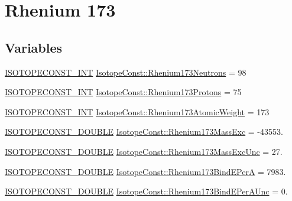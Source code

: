 \hypertarget{group___isotope_const-_rhenium-_re173}{}\section{Rhenium 173}
\label{group___isotope_const-_rhenium-_re173}
\subsection*{Variables}
\begin{DoxyCompactItemize}
\item 
\mbox{\hyperlink{group___isotope_const-_macros_ga5f18360b3e99483a35c32d789e62621c}{I\+S\+O\+T\+O\+P\+E\+C\+O\+N\+S\+T\+\_\+\+I\+NT}} \mbox{\hyperlink{group___isotope_const-_rhenium-_re173_gad195a17871d0e1067a87ea85cd9299b4}{Isotope\+Const\+::\+Rhenium173\+Neutrons}} = 98
\item 
\mbox{\hyperlink{group___isotope_const-_macros_ga5f18360b3e99483a35c32d789e62621c}{I\+S\+O\+T\+O\+P\+E\+C\+O\+N\+S\+T\+\_\+\+I\+NT}} \mbox{\hyperlink{group___isotope_const-_rhenium-_re173_ga5518bb176503b143c064cb39377e636a}{Isotope\+Const\+::\+Rhenium173\+Protons}} = 75
\item 
\mbox{\hyperlink{group___isotope_const-_macros_ga5f18360b3e99483a35c32d789e62621c}{I\+S\+O\+T\+O\+P\+E\+C\+O\+N\+S\+T\+\_\+\+I\+NT}} \mbox{\hyperlink{group___isotope_const-_rhenium-_re173_gaf47c1ed342eebaeca15d04a4fb8942b6}{Isotope\+Const\+::\+Rhenium173\+Atomic\+Weight}} = 173
\item 
\mbox{\hyperlink{group___isotope_const-_macros_ga8f45a7272ce02c0b4c65c44636ed719a}{I\+S\+O\+T\+O\+P\+E\+C\+O\+N\+S\+T\+\_\+\+D\+O\+U\+B\+LE}} \mbox{\hyperlink{group___isotope_const-_rhenium-_re173_ga42e0b910e3ee2c6df3f6557be1d74de4}{Isotope\+Const\+::\+Rhenium173\+Mass\+Exc}} = -\/43553.
\item 
\mbox{\hyperlink{group___isotope_const-_macros_ga8f45a7272ce02c0b4c65c44636ed719a}{I\+S\+O\+T\+O\+P\+E\+C\+O\+N\+S\+T\+\_\+\+D\+O\+U\+B\+LE}} \mbox{\hyperlink{group___isotope_const-_rhenium-_re173_ga26d5428d8bbc3267181acecefe50bfcd}{Isotope\+Const\+::\+Rhenium173\+Mass\+Exc\+Unc}} = 27.
\item 
\mbox{\hyperlink{group___isotope_const-_macros_ga8f45a7272ce02c0b4c65c44636ed719a}{I\+S\+O\+T\+O\+P\+E\+C\+O\+N\+S\+T\+\_\+\+D\+O\+U\+B\+LE}} \mbox{\hyperlink{group___isotope_const-_rhenium-_re173_ga75d7f5599785e8ade6cba9e833302698}{Isotope\+Const\+::\+Rhenium173\+Bind\+E\+PerA}} = 7983.
\item 
\mbox{\hyperlink{group___isotope_const-_macros_ga8f45a7272ce02c0b4c65c44636ed719a}{I\+S\+O\+T\+O\+P\+E\+C\+O\+N\+S\+T\+\_\+\+D\+O\+U\+B\+LE}} \mbox{\hyperlink{group___isotope_const-_rhenium-_re173_ga05bd5e27c1d38e5797ad18585bad27a3}{Isotope\+Const\+::\+Rhenium173\+Bind\+E\+Per\+A\+Unc}} = 0.

\end{DoxyCompactItemize}
